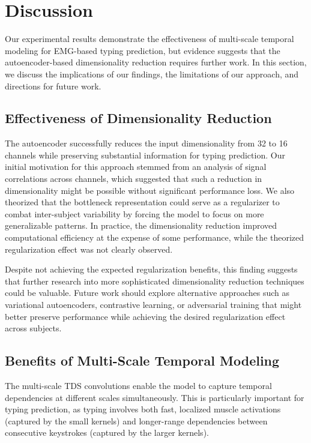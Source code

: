 \section{Discussion}

Our experimental results demonstrate the effectiveness of multi-scale temporal modeling for EMG-based typing prediction, but evidence suggests that the autoencoder-based dimensionality reduction requires further work. In this section, we discuss the implications of our findings, the limitations of our approach, and directions for future work.

\subsection{Effectiveness of Dimensionality Reduction}

The autoencoder successfully reduces the input dimensionality from 32 to 16 channels while preserving substantial information for typing prediction. Our initial motivation for this approach stemmed from an analysis of signal correlations across channels, which suggested that such a reduction in dimensionality might be possible without significant performance loss. We also theorized that the bottleneck representation could serve as a regularizer to combat inter-subject variability by forcing the model to focus on more generalizable patterns. In practice, the dimensionality reduction improved computational efficiency at the expense of some performance, while the theorized regularization effect was not clearly observed.

Despite not achieving the expected regularization benefits, this finding suggests that further research into more sophisticated dimensionality reduction techniques could be valuable. Future work should explore alternative approaches such as variational autoencoders, contrastive learning, or adversarial training that might better preserve performance while achieving the desired regularization effect across subjects.

\subsection{Benefits of Multi-Scale Temporal Modeling}

The multi-scale TDS convolutions enable the model to capture temporal dependencies at different scales simultaneously. This is particularly important for typing prediction, as typing involves both fast, localized muscle activations (captured by the small kernels) and longer-range dependencies between consecutive keystrokes (captured by the larger kernels).

